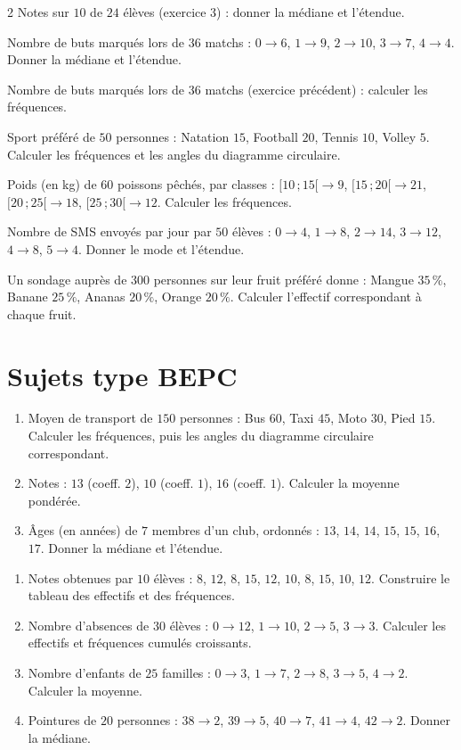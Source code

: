 \begin{multicols}{2}
\exo{} Notes sur $10$ de $24$ élèves (exercice 3) : donner la médiane et
l'étendue.

\exo{} Nombre de buts marqués lors de $36$ matchs : $0\to6$, $1\to9$, $2\to10$,
$3\to7$, $4\to4$. Donner la médiane et l'étendue.

\exo{} Nombre de buts marqués lors de $36$ matchs (exercice précédent) : calculer
les fréquences.

\exo{} Sport préféré de $50$ personnes : Natation $15$, Football $20$, Tennis
$10$, Volley $5$. Calculer les fréquences et les angles du diagramme circulaire.

\exo{} Poids (en kg) de $60$ poissons pêchés, par classes : $[10\,;15[\to9$,
$[15\,;20[\to21$, $[20\,;25[\to18$, $[25\,;30[\to12$. Calculer les fréquences.

\exo{} Nombre de SMS envoyés par jour par $50$ élèves : $0\to4$, $1\to8$,
$2\to14$, $3\to12$, $4\to8$, $5\to4$. Donner le mode et l'étendue.

\exo{} Un sondage auprès de $300$ personnes sur leur fruit préféré donne : Mangue
$35\,\%$, Banane $25\,\%$, Ananas $20\,\%$, Orange $20\,\%$. Calculer l'effectif
correspondant à chaque fruit.

\end{multicols}

\section{Sujets type BEPC}

\begin{enumerate}[label=\arabic*)]
\item Moyen de transport de $150$ personnes : Bus $60$, Taxi $45$, Moto $30$, Pied $15$.
Calculer les fréquences, puis les angles du diagramme circulaire correspondant.
\item Notes : $13$ (coeff. $2$), $10$ (coeff. $1$), $16$ (coeff. $1$). Calculer la moyenne
pondérée.
\item Âges (en années) de $7$ membres d'un club, ordonnés : $13$, $14$, $14$, $15$, $15$,
$16$, $17$. Donner la médiane et l'étendue.
\end{enumerate}

\begin{enumerate}[label=\arabic*)]
\item Notes obtenues par $10$ élèves : $8$, $12$, $8$, $15$, $12$, $10$, $8$, $15$, $10$,
$12$. Construire le tableau des effectifs et des fréquences.
\item Nombre d'absences de $30$ élèves : $0\to12$, $1\to10$, $2\to5$, $3\to3$. Calculer
les effectifs et fréquences cumulés croissants.
\item Nombre d'enfants de $25$ familles : $0\to3$, $1\to7$, $2\to8$, $3\to5$, $4\to2$.
Calculer la moyenne.
\item Pointures de $20$ personnes : $38\to2$, $39\to5$, $40\to7$, $41\to4$, $42\to2$.
Donner la médiane.
\end{enumerate}


